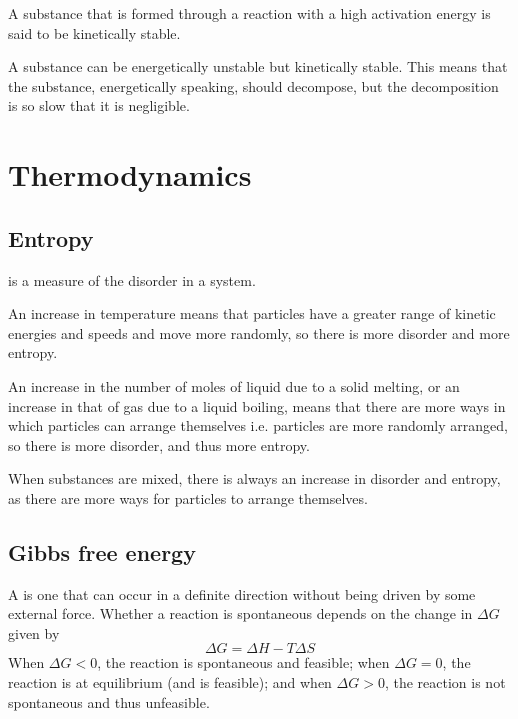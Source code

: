 \documentclass[Chemistry.tex]{subfiles}
\begin{document}
A substance that is formed through a reaction with a high activation energy is said to be kinetically stable.

A substance can be energetically unstable but kinetically stable. This means that the substance, energetically speaking, should decompose, but the decomposition is so slow that it is negligible.
\section{Thermodynamics}
\subsection{Entropy}
 is a measure of the disorder in a system.

An increase in temperature means that particles have a greater range of kinetic energies and speeds and move more randomly, so there is more disorder and more entropy.

An increase in the number of moles of liquid due to a solid melting, or an increase in that of gas due to a liquid boiling, means that there are more ways in which particles can arrange themselves i.e. particles are more randomly arranged, so there is more disorder, and thus more entropy.

When substances are mixed, there is always an increase in disorder and entropy, as there are more ways for particles to arrange themselves.
\subsection{Gibbs free energy}
A  is one that can occur in a definite direction without being driven by some external force. Whether a reaction is spontaneous depends on the change in  \(\Delta G\) given by \begin{equation}\Delta G = \Delta H - T\Delta S\end{equation} When \(\Delta G < 0\), the reaction is spontaneous and feasible; when \(\Delta G = 0\), the reaction is at equilibrium (and is feasible); and when \(\Delta G > 0\), the reaction is not spontaneous and thus unfeasible.
\end{document}
